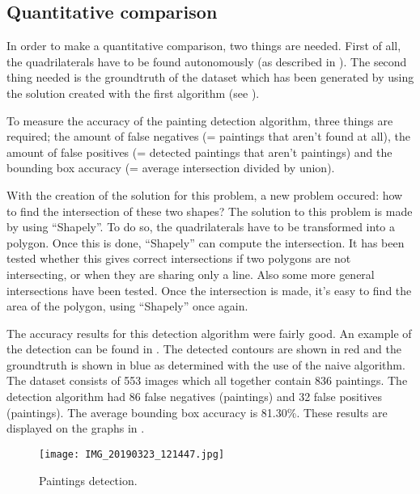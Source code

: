 
\subsection{Quantitative comparison}
In order to make a quantitative comparison, two things are needed. First of all, the quadrilaterals have to be found autonomously (as described in ). The second thing needed is the groundtruth of the dataset which has been generated by using the solution created with the first algorithm (see ).

To measure the accuracy of the painting detection algorithm, three things are required; the amount of false negatives (= paintings that aren't found at all), the amount of false positives (= detected paintings that aren't paintings) and the bounding box accuracy (= average intersection divided by union).

With the creation of the solution for this problem, a new problem occured: how to find the intersection of these two shapes? The solution to this problem is made by using ``Shapely''. To do so, the quadrilaterals have to be transformed into a polygon. Once this is done, ``Shapely'' can compute the intersection. It has been tested whether this gives correct intersections if two polygons are not intersecting, or when they are sharing only a line. Also some more general intersections have been tested. Once the intersection is made, it's easy to find the area of the polygon, using ``Shapely'' once again.

The accuracy results for this detection algorithm were fairly good. An example of the detection can be found in . The detected contours are shown in red and the groundtruth is shown in blue as determined with the use of the naive algorithm. The dataset consists of 553 images which all together contain 836 paintings. The detection algorithm had 86 false negatives (paintings) and 32 false positives (paintings). The average bounding box accuracy is 81.30\%. These results are displayed on the graphs in .

\begin{figure}[h]
    \texttt{[image: IMG\_20190323\_121447.jpg]}
    \centering
    \caption{Paintings detection.}
    \label{fig:paiting_detection_with_ground_truth}
\end{figure}

